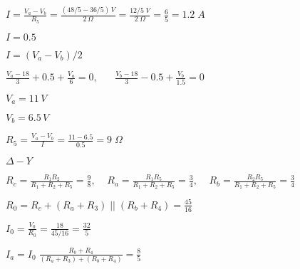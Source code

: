 \documentclass{article}
\def\lthtmlcheckvsize{\ifdim\ht\sizebox<\vsize 
  \ifdim\wd\sizebox<\hsize\expandafter\hfill\fi \expandafter\vfill
  \else\expandafter\vss\fi}%
\begin{document}
{\newpage\clearpage
{}%
$\displaystyle I=\frac{V_a-V_b}{R_5}=\frac{(48/5-36/5)\,V}{2\,\Omega}
=\frac{12/5\;V}{2\;\Omega}=\frac{6}{5}=1.2\;A$%
\lthtmlindisplaymathZ
\lthtmlcheckvsize\clearpage}

{\newpage\clearpage
{}%
$ I=0.5$%
\lthtmlindisplaymathZ
\lthtmlcheckvsize\clearpage}

{\newpage\clearpage
{}%
$ I=(V_a-V_b)/2$%
\lthtmlindisplaymathZ
\lthtmlcheckvsize\clearpage}

{\newpage\clearpage
{}%
$\displaystyle \frac{V_a-18}{3}+0.5+\frac{V_a}{6}=0,\;\;\;\;\;\;
\frac{V_b-18}{3}-0.5+\frac{V_b}{1.5}=0$%
\lthtmlindisplaymathZ
\lthtmlcheckvsize\clearpage}

{\newpage\clearpage
{}%
$ V_a=11\,V$%
\lthtmlindisplaymathZ
\lthtmlcheckvsize\clearpage}

{\newpage\clearpage
{}%
$ V_b=6.5\,V$%
\lthtmlindisplaymathZ
\lthtmlcheckvsize\clearpage}

{\newpage\clearpage
{}%
$\displaystyle R_5=\frac{V_a-V_b}{I}=\frac{11-6.5}{0.5}=9\;\Omega$%
\lthtmlindisplaymathZ
\lthtmlcheckvsize\clearpage}

{\newpage\clearpage
{}%
$ \Delta-Y$%
\lthtmlindisplaymathZ
\lthtmlcheckvsize\clearpage}

{\newpage\clearpage
{}%
$\displaystyle R_c=\frac{R_1R_2}{R_1+R_2+R_5}=\frac{9}{8},\;\;\;\;
R_a=\frac{R_1R_5}{R_1+R_2+R_5}=\frac{3}{4},\;\;\;\;
R_b=\frac{R_2R_5}{R_1+R_2+R_5}=\frac{3}{4}$%
\lthtmlindisplaymathZ
\lthtmlcheckvsize\clearpage}

{\newpage\clearpage
{}%
$\displaystyle R_0=R_c+(R_a+R_3) \;||\; (R_b+R_4)=\frac{45}{16}$%
\lthtmlindisplaymathZ
\lthtmlcheckvsize\clearpage}

{\newpage\clearpage
{}%
$\displaystyle I_0=\frac{V_0}{R_0}=\frac{18}{45/16}=\frac{32}{5}$%
\lthtmlindisplaymathZ
\lthtmlcheckvsize\clearpage}

{\newpage\clearpage
{}%
$\displaystyle I_a=I_0\;\frac{R_b+R_4}{(R_a+R_3)+(R_b+R_4)}=\frac{8}{5}$%
\lthtmlindisplaymathZ
\lthtmlcheckvsize\clearpage}
\end{document}
